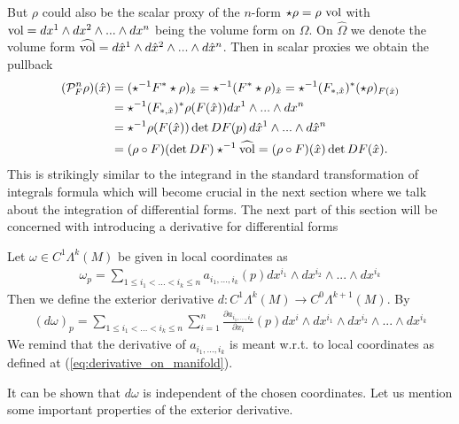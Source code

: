 \documentclass[../master_thesis.tex]{subfiles}
\begin{document}
But $\rho$ could also be the scalar proxy of the $n$-form 
$\star \rho = \rho\, \operatorname{vol}$ with $\operatorname{vol} = dx^1 \wedge dx^2
\wedge ... \wedge dx^n$ being the volume form on $\Omega$. 
On $\hat{\Omega}$ we denote the volume form
$\widehat{\operatorname{vol}} = d\hat{x}^1 \wedge d\hat{x}^2 \wedge ... \wedge d\hat{x}^n$.
Then in scalar proxies we obtain the pullback
\begin{align*}
    (\mathcal{P}_F^n \rho )(\hat{x}) 
    &= (\star ^{-1}F^* \star \rho)_{\hat{x}}
    = \star ^{-1} (F^* \star \rho)_{\hat{x}}
    = \star ^{-1} (F_{*,\hat{x}})^* (\star \rho)_{F(\hat{x})}
    \\ &= \star ^{-1} (F_{*,\hat{x}})^* \rho(F(\hat{x})) dx^1 \wedge ... \wedge dx^n
    \\ &= \star ^{-1} \rho(F(\hat{x})) \det DF(p) \, d\hat{x}^1 \wedge ... \wedge d\hat{x}^n
    \\ &=  (\rho \circ F) (\det DF) \star^{-1}\widehat{\operatorname{vol}}
    = (\rho \circ F)(\hat{x}) \det DF(\hat{x}).
\end{align*}
This is strikingly similar to the integrand in the standard transformation 
of integrals formula which will become crucial in the next section
where we talk about the
integration of differential forms. The next part of this section will be 
concerned with introducing a derivative for differential forms

\begin{definition}
    Let $\omega \in C^1\Lambda^k (M)$ be given in local coordinates as
    \begin{align*}
        \omega_p = \sum\limits_{1\leq i_1 < ... < i_k \leq n} 
            a_{i_1,...,i_k}(p) dx^{i_1} \wedge dx^{i_2} \wedge ... \wedge dx^{i_k}
    \end{align*}
    Then we define the exterior derivative $d: C^1 \Lambda^{k}(M) \rightarrow 
    C^0\Lambda^{k+1}(M)$. By
    \begin{align*}
        (d\omega)_p = \sum\limits_{1\leq i_1 < ... < i_k \leq n} \sum\limits_{i=1}^n
        \frac{\partial a_{i_1,...,i_k}}{\partial x_i}(p) 
        dx^i \wedge dx^{i_1} \wedge dx^{i_2} \wedge ... \wedge dx^{i_k}
    \end{align*}
    We remind that the derivative of $a_{i_1,...,i_k}$ is meant w.r.t. 
    to local coordinates as defined at (\ref{eq:derivative_on_manifold}).
\end{definition}
It can be shown that $d\omega$ is independent of the chosen coordinates. 
Let us mention some important properties of the exterior derivative. 
\end{document}
